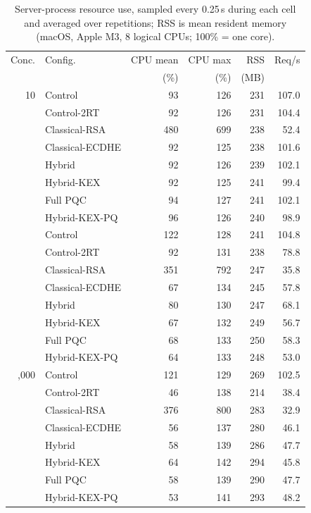 \begin{table}[t]
\centering
\caption{Server-process resource use, sampled every 0.25\,s during each cell and averaged over repetitions; RSS is mean resident memory (macOS, Apple M3, 8 logical CPUs; 100\% = one core).}
\label{tab:resources}
\setlength{\tabcolsep}{2.5pt}
\footnotesize
\begin{tabular}{@{}rlrrrr@{}}
\toprule
Conc. & Config. & CPU mean & CPU max & RSS & Req/s \\
 & & (\%) & (\%) & (MB) & \\
\midrule
10 & Control & 93 & 126 & 231 & 107.0 \\
 & Control-2RT & 92 & 126 & 231 & 104.4 \\
 & Classical-RSA & 480 & 699 & 238 & 52.4 \\
 & Classical-ECDHE & 92 & 125 & 238 & 101.6 \\
 & Hybrid & 92 & 126 & 239 & 102.1 \\
 & Hybrid-KEX & 92 & 125 & 241 & 99.4 \\
 & Full PQC & 94 & 127 & 241 & 102.1 \\
 & Hybrid-KEX-PQ & 96 & 126 & 240 & 98.9 \\
\addlinespace
100 & Control & 122 & 128 & 241 & 104.8 \\
 & Control-2RT & 92 & 131 & 238 & 78.8 \\
 & Classical-RSA & 351 & 792 & 247 & 35.8 \\
 & Classical-ECDHE & 67 & 134 & 245 & 57.8 \\
 & Hybrid & 80 & 130 & 247 & 68.1 \\
 & Hybrid-KEX & 67 & 132 & 249 & 56.7 \\
 & Full PQC & 68 & 133 & 250 & 58.3 \\
 & Hybrid-KEX-PQ & 64 & 133 & 248 & 53.0 \\
\addlinespace
1,000 & Control & 121 & 129 & 269 & 102.5 \\
 & Control-2RT & 46 & 138 & 214 & 38.4 \\
 & Classical-RSA & 376 & 800 & 283 & 32.9 \\
 & Classical-ECDHE & 56 & 137 & 280 & 46.1 \\
 & Hybrid & 58 & 139 & 286 & 47.7 \\
 & Hybrid-KEX & 64 & 142 & 294 & 45.8 \\
 & Full PQC & 58 & 139 & 290 & 47.7 \\
 & Hybrid-KEX-PQ & 53 & 141 & 293 & 48.2 \\
\bottomrule
\end{tabular}
\end{table}
